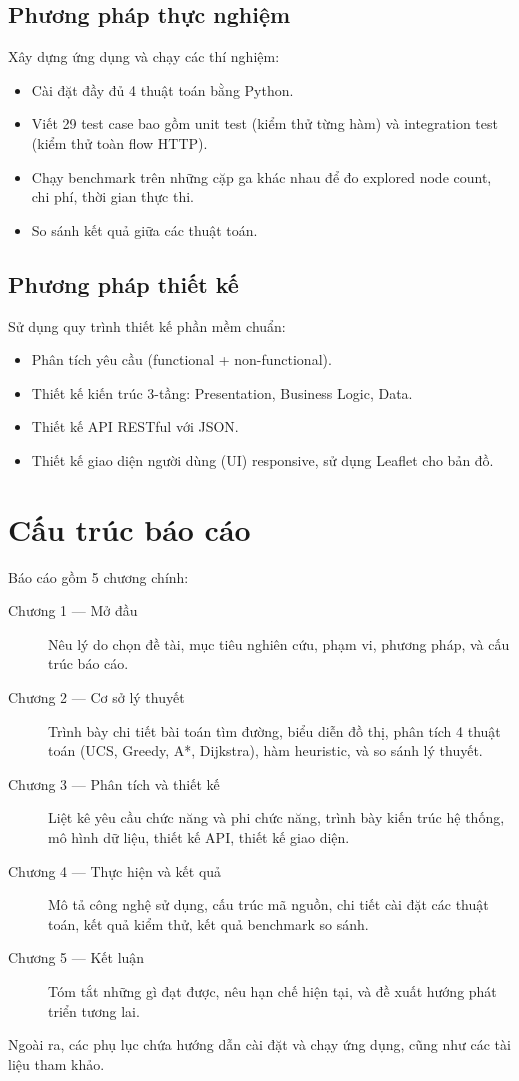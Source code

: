 \subsection{Phương pháp thực nghiệm}

Xây dựng ứng dụng và chạy các thí nghiệm:
\begin{itemize}
  \item Cài đặt đầy đủ 4 thuật toán bằng Python.
  \item Viết 29 test case bao gồm unit test (kiểm thử từng hàm) và integration test (kiểm thử toàn flow HTTP).
  \item Chạy benchmark trên những cặp ga khác nhau để đo explored node count, chi phí, thời gian thực thi.
  \item So sánh kết quả giữa các thuật toán.
\end{itemize}

\subsection{Phương pháp thiết kế}

Sử dụng quy trình thiết kế phần mềm chuẩn:
\begin{itemize}
  \item Phân tích yêu cầu (functional + non-functional).
  \item Thiết kế kiến trúc 3-tầng: Presentation, Business Logic, Data.
  \item Thiết kế API RESTful với JSON.
  \item Thiết kế giao diện người dùng (UI) responsive, sử dụng Leaflet cho bản đồ.
\end{itemize}

\section{Cấu trúc báo cáo}

Báo cáo gồm 5 chương chính:

\begin{description}
  \item[Chương 1 --- Mở đầu] Nêu lý do chọn đề tài, mục tiêu nghiên cứu, phạm vi, phương pháp, và cấu trúc báo cáo.

  \item[Chương 2 --- Cơ sở lý thuyết] Trình bày chi tiết bài toán tìm đường, biểu diễn đồ thị, phân tích 4 thuật toán (UCS, Greedy, A*, Dijkstra), hàm heuristic, và so sánh lý thuyết.

  \item[Chương 3 --- Phân tích và thiết kế] Liệt kê yêu cầu chức năng và phi chức năng, trình bày kiến trúc hệ thống, mô hình dữ liệu, thiết kế API, thiết kế giao diện.

  \item[Chương 4 --- Thực hiện và kết quả] Mô tả công nghệ sử dụng, cấu trúc mã nguồn, chi tiết cài đặt các thuật toán, kết quả kiểm thử, kết quả benchmark so sánh.

  \item[Chương 5 --- Kết luận] Tóm tắt những gì đạt được, nêu hạn chế hiện tại, và đề xuất hướng phát triển tương lai.
\end{description}

Ngoài ra, các phụ lục chứa hướng dẫn cài đặt và chạy ứng dụng, cũng như các tài liệu tham khảo.
